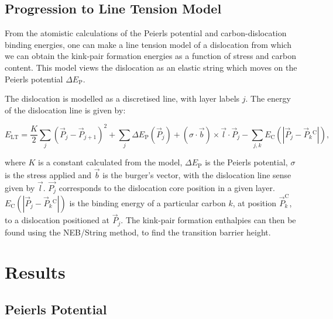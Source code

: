 \documentclass[a4paper,11pt]{article}
\begin{document}
\subsection{Progression to Line Tension Model}
\label{sec:orgb4f8f72}

From the atomistic calculations of the Peierls potential and carbon-dislocation binding energies, one can make a
line tension model of a dislocation from which we can obtain the kink-pair formation energies as
a function of stress and carbon content.  This model views the dislocation as an elastic string
which moves on the Peierls potential \(\Delta E_{\text{P}}\).

The dislocation is modelled as a discretised line, with layer labels \(j\). The energy of the
dislocation line is given by:

\[ E_{\text{LT}} = \frac{K}{2} \sum_j (\vec{P}_j - \vec{P}_{j+1} )^2  + \sum_j \Delta E_{\text{P}}  (\vec{P}_j) +
   (\sigma \cdot \vec{b}) \times \vec{l} \cdot \vec{P}_j  - \sum_{j,k} E_{\text{C}} (|\vec{P}_j-\vec{P}_k^{}^{\text{C}}|), \]

where \(K\) is a constant calculated from the model, \(\Delta E_{\text{P}}\) is the Peierls potential, \(\sigma\) is
the stress applied and \(\vec{b}\) is the burger's vector, with the dislocation line sense given by
\(\vec{l}\). \(\vec{P_{j}}\) corresponds to the dislocation core position in a given
layer. \(E_{\text{C}} (|\vec{P}_j-\vec{P}_k^{}^{\text{C}}|)\) is the binding energy of a particular carbon
\(k\), at position \(\vec{P}_k^{\text{C}}\), to a dislocation positioned at \(\vec{P}_j\). The kink-pair
formation enthalpies can then be found using the NEB/String method, to find the transition
barrier height. 

\section{Results}
\label{sec:org87bf071}

\subsection{Peierls Potential}
\label{sec:org3681a12}
\end{document}
